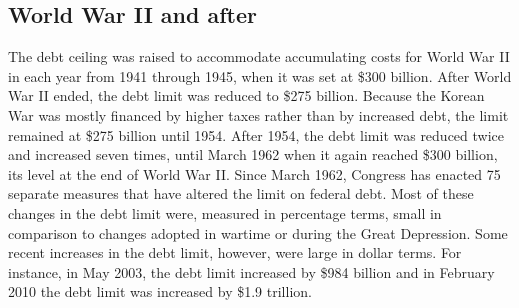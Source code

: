 \subsection{World War II and after}
The debt ceiling was raised to accommodate accumulating costs for World War II in each year from 1941 through 1945, when it was set at \$300 billion. After World War II ended, the debt limit was reduced to \$275 billion. Because the Korean War was mostly financed by higher taxes rather than by increased debt, the limit remained at \$275 billion until 1954. After 1954, the debt limit was reduced twice and increased seven times, until March 1962 when it again reached \$300 billion, its level at the end of World War II. Since March 1962, Congress has enacted 75 separate measures that have altered the limit on federal debt. Most of these changes in the debt limit were, measured in percentage terms, small in comparison to changes adopted in wartime or during the Great Depression. Some recent increases in the debt limit, however, were large in dollar terms. For instance, in May 2003, the debt limit increased by \$984 billion and in February 2010 the debt limit was increased by \$1.9 trillion.




